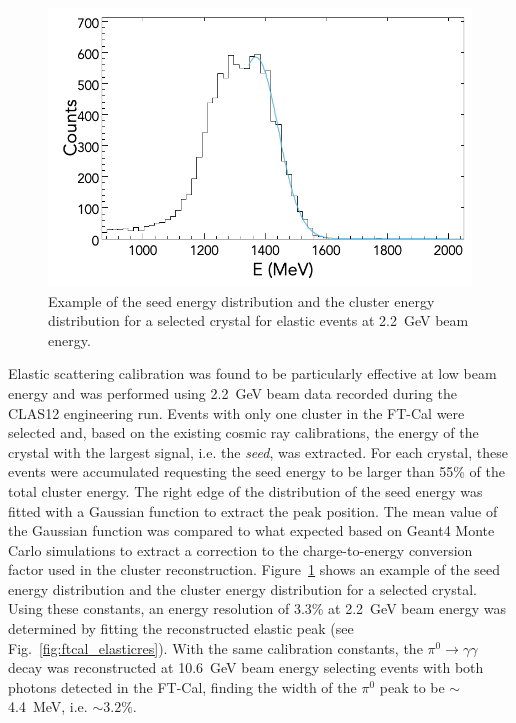 \begin{figure}
\includegraphics[width=0.9\columnwidth]{fig/ftcal_elastic_seed.png}
\caption{Example of the seed energy distribution and the cluster energy distribution for a selected crystal for
  elastic events at 2.2~GeV beam energy.}
\label{fig:ftcal_elasticcal}
\end{figure}

Elastic scattering calibration was found to be particularly effective at low beam energy and was performed using
2.2~GeV beam data recorded during the CLAS12 engineering run. Events with only one cluster in the FT-Cal were
selected and, based on the existing cosmic ray calibrations, the energy of the crystal with the largest signal, i.e. the
{\it seed}, was extracted. For each crystal, these events were accumulated requesting the seed energy to be larger
than 55\% of the total cluster energy. The right edge of the distribution of the seed energy was fitted with a
Gaussian function to extract the peak position. The mean value of the Gaussian function was compared to what
expected based on Geant4 Monte Carlo simulations to extract a correction to the charge-to-energy conversion factor
used in the cluster reconstruction. Figure~\ref{fig:ftcal_elasticcal} shows an example of the seed energy distribution
and the cluster energy distribution for a selected crystal. Using these constants, an energy resolution of 3.3\% at
2.2~GeV beam energy was determined by fitting the reconstructed elastic peak (see Fig.~\ref{fig:ftcal_elasticres}).
With the same calibration constants, the $\pi^0\to\gamma\gamma$ decay was reconstructed at 10.6~GeV beam
energy selecting events with both photons detected in the FT-Cal, finding the width of the $\pi^0$ peak to be
$\sim$4.4~MeV, i.e. $\sim 3.2\%$.

